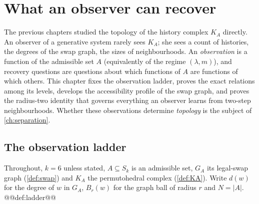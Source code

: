 \chapter{What an observer can recover}\label{ch:access}

The previous chapters studied the topology of the history complex $K_A$ directly. An observer of a generative system rarely sees $K_A$; she sees a count of histories, the degrees of the swap graph, the sizes of neighbourhoods. An \emph{observation} is a function of the admissible set $A$ (equivalently of the regime $(\lambda,m)$), and recovery questions are questions about which functions of $A$ are functions of which others. This chapter fixes the observation ladder, proves the exact relations among its levels, develops the accessibility profile of the swap graph, and proves the radius-two identity that governs everything an observer learns from two-step neighbourhoods. Whether these observations determine \emph{topology} is the subject of \cref{ch:separation}.

\section{The observation ladder}\label{sec:ladder}
Throughout, $k=6$ unless stated, $A\subseteq S_k$ is an admissible set, $G_A$ its legal-swap graph (\cref{def:swap}) and $K_A$ the permutohedral complex (\cref{def:KA}). Write $d(w)$ for the degree of $w$ in $G_A$, $B_r(w)$ for the graph ball of radius $r$ and $N=|A|$.
@@def:ladder@@

